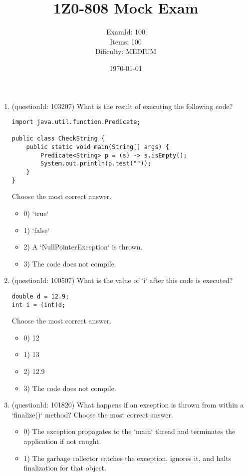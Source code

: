 \documentclass[12pt]{article}
\title{\textbf{1Z0-808 Mock Exam}}
\author{ExamId: 100 \\ Items: 100 \\ Dificulty: MEDIUM}
\date{\today}
\begin{document}
\maketitle
\newpage\begin{enumerate}[label=(\arabic*)]
\item (questionId: 103207) What is the result of executing the following code?
\begin{verbatim}
import java.util.function.Predicate;

public class CheckString {
    public static void main(String[] args) {
        Predicate<String> p = (s) -> s.isEmpty();
        System.out.println(p.test(""));
    }
}
\end{verbatim}
Choose the most correct answer. 
\begin{itemize}
\item 0) `true`

\item 1) `false`

\item 2) A `NullPointerException` is thrown.

\item 3) The code does not compile.

\end{itemize}
\item (questionId: 100507) What is the value of `i` after this code is executed?
\begin{verbatim}
double d = 12.9;
int i = (int)d;
\end{verbatim}
Choose the most correct answer. 
\begin{itemize}
\item 0) 12

\item 1) 13

\item 2) 12.9

\item 3) The code does not compile.

\end{itemize}
\item (questionId: 101820) What happens if an exception is thrown from within a `finalize()` method?
Choose the most correct answer. 
\begin{itemize}
\item 0) The exception propagates to the `main` thread and terminates the application if not caught.

\item 1) The garbage collector catches the exception, ignores it, and halts finalization for that object.


\end{itemize}
\end{enumerate}
\end{document}
